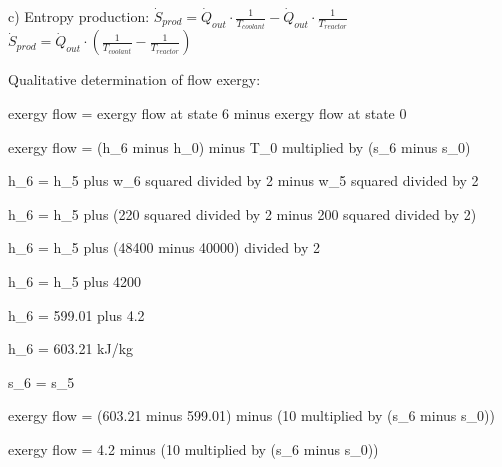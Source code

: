 c) Entropy production:  
\( \dot{S}_{prod} = \dot{Q}_{out} \cdot \frac{1}{T_{coolant}} - \dot{Q}_{out} \cdot \frac{1}{T_{reactor}} \)  
\( \dot{S}_{prod} = \dot{Q}_{out} \cdot ( \frac{1}{T_{coolant}} - \frac{1}{T_{reactor}} ) \)

Qualitative determination of flow exergy:  

exergy flow = exergy flow at state 6 minus exergy flow at state 0  

exergy flow = (h_6 minus h_0) minus T_0 multiplied by (s_6 minus s_0)  

h_6 = h_5 plus w_6 squared divided by 2 minus w_5 squared divided by 2  

h_6 = h_5 plus (220 squared divided by 2 minus 200 squared divided by 2)  

h_6 = h_5 plus (48400 minus 40000) divided by 2  

h_6 = h_5 plus 4200  

h_6 = 599.01 plus 4.2  

h_6 = 603.21 kJ/kg  

s_6 = s_5  

exergy flow = (603.21 minus 599.01) minus (10 multiplied by (s_6 minus s_0))  

exergy flow = 4.2 minus (10 multiplied by (s_6 minus s_0))